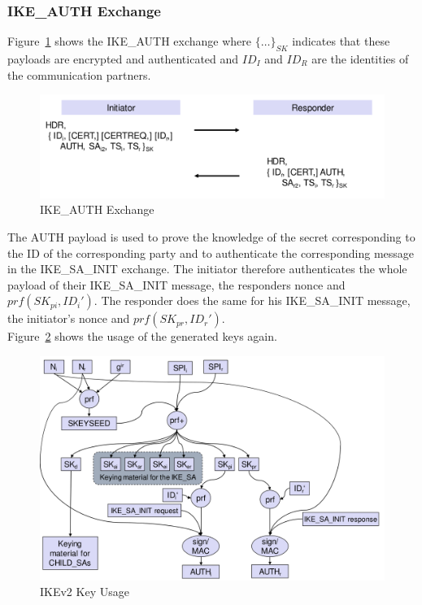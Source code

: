 \subsubsection{IKE\_AUTH Exchange}
Figure~\ref{fig:ike_auth} shows the IKE\_AUTH exchange where $\{\dots \}_{SK}$ indicates that these payloads are encrypted and authenticated and $ID_I$ and $ID_R$ are the identities of the communication partners.
\begin{figure}[h]
  \centering
  \includegraphics[width=.8\textwidth]{figures/ike_auth.png}
  \caption{IKE\_AUTH Exchange}\label{fig:ike_auth}
\end{figure}
The AUTH payload is used to prove the knowledge of the secret corresponding to the ID of the corresponding party and to authenticate the corresponding message in the IKE\_SA\_INIT exchange.
The initiator therefore authenticates the whole payload of their IKE\_SA\_INIT message, the responders nonce and $prf(SK_{pi}, ID_i')$.
The responder does the same for his IKE\_SA\_INIT message, the initiator's nonce and $prf(SK_{pr},ID_r')$.\\

Figure~\ref{fig:ike_keys} shows the usage of the generated keys again.
\begin{figure}[h]
  \centering
  \includegraphics[width=.8\textwidth]{figures/ike_keys.png}
  \caption{IKEv2 Key Usage}\label{fig:ike_keys}
\end{figure}

